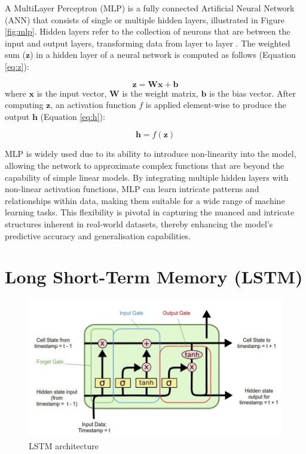 A MultiLayer Perceptron (MLP) is a fully connected Artificial Neural Network (ANN) that consists of single or multiple hidden layers, illustrated in Figure \ref{fig:mlp}. Hidden layers refer to the collection of neurons that are between the input and output layers, transforming data from layer to layer \cite{uzair-2020-hidden-layers}. The weighted sum (\( \mathbf{z} \)) in a hidden layer of a neural network is computed as follows (Equation \eqref{eq:z}):

\begin{equation}
    \label{eq:z}
    \mathbf{z} = \mathbf{W}\mathbf{x} + \mathbf{b}
\end{equation} where \( \mathbf{x} \) is the input vector, \( \mathbf{W} \) is the weight matrix, \( \mathbf{b} \) is the bias vector. After computing \( \mathbf{z} \), an activation function \( f \) is applied element-wise to produce the output \( \mathbf{h} \) (Equation \eqref{eq:h}):

\begin{equation}
    \label{eq:h}
    \mathbf{h} = f(\mathbf{z})
\end{equation}

MLP is widely used due to its ability to introduce non-linearity into the model, allowing the network to approximate complex functions that are beyond the capability of simple linear models. By integrating multiple hidden layers with non-linear activation functions, MLP can learn intricate patterns and relationships within data, making them suitable for a wide range of machine learning tasks. This flexibility is pivotal in capturing the nuanced and intricate structures inherent in real-world datasets, thereby enhancing the model's predictive accuracy and generalisation capabilities.


\section{Long Short-Term Memory (LSTM)}

\begin{figure}[htbp]
    \centering
    \includegraphics[width=0.9\linewidth]{images/lstm.jpeg}
    \caption{LSTM architecture \cite{rahman-2023-lstm-networks}}
    \label{fig:lstm}
\end{figure}

